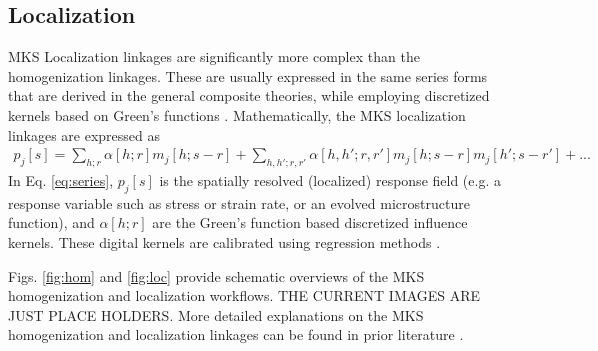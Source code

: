 \documentclass{bmcart}
\begin{document}
\subsection{Localization}

MKS Localization linkages are significantly more complex than the
homogenization linkages. These are usually expressed in the same
series forms that are derived in the general composite theories, while
employing discretized kernels based on Green's functions
\cite{brown1955solid, hill1963elastic, kroner1986statistical,
  kroner1977bounds, kroner1972statistical, etingof1993representations,
  adams1998mesostructure, fullwood2008strong, torquato2013random,
  li2006quantitative, milhans2011prediction, adams2013microstructure,
  garmestani2001statistical}. Mathematically, the MKS localization
linkages are expressed as
\begin{multline}
    \label{eq:series}
    p_j[s] = \sum_{h; r} \alpha[h; r] m_j[h; s - r] + \sum_{h, h'; r, r'}
    \alpha[h, h'; r, r'] m_j[h; s - r] m_j[h'; s - r'] + ...
\end{multline}
In Eq. \ref{eq:series}, $p_j[s]$ is the spatially resolved (localized)
response field (e.g. a response variable such as stress or strain
rate, or an evolved microstructure function), and $\alpha[h; r]$ are
the Green's function based discretized influence kernels. These
digital kernels are calibrated using regression methods
\cite{al2012multi, kalidindi2010novel, landi2010multi,
  yabansu2014calibrated, yabansu2015representation,
  brough2016microstructure}.

Figs. \ref{fig:hom} and \ref{fig:loc} provide schematic overviews of the MKS homogenization and localization workflows. THE CURRENT IMAGES ARE JUST PLACE HOLDERS. More detailed explanations on the MKS homogenization and localization linkages can be found in prior literature \cite{landi2010multi, kalidindi2010novel, yabansu2014calibrated, al2012multi, kalidindi2011microstructure, gupta2015structure,  cceccen2014data, niezgoda2013novel, niezgoda2011understanding, cecen2016versatile}.

\end{document}
